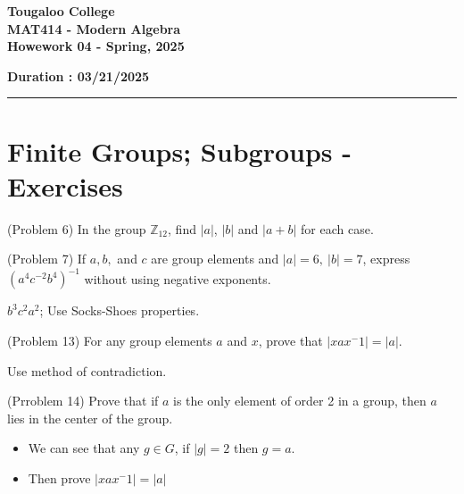 \documentclass[12pt]{exam}
\newcommand{\paper}[5]{
    \setcounter{page}{1}
    
    \begin{minipage}{\textwidth}
    \Large{\textbf{Tougaloo College}}\\
    \textbf{#2}\\
    \textbf{#5 - #3}\\
    \end{minipage}
    \hfill
        \begin{minipage}{6in}
            \textbf{\hspace{0.25in}Duration : #1}
        \end{minipage}
    
    \vspace{0.1in}
    \rule[1ex]{\textwidth}{2pt}
    }
\begin{document}
\paper{03/21/2025}{MAT414 - Modern Algebra}{Spring, 2025}{}{Howework 04}

\section*{Finite Groups; Subgroups - Exercises}
\begin{questions}

\question[] (Problem 6) In the group \(\mathbb{Z}_{12}\), find \(|a|\), \(|b|\) and \(|a+b|\) for each case.

\question[] (Problem 7) If \(a,b,\) and \(c\) are group elements and \(|a|=6,~|b|=7\), express \((a^4c^{-2}b^4)^{-1}\) without using negative exponents.

\begin{solution}
    \(b^3c^2a^2\); Use Socks-Shoes properties. 
\end{solution}

\question[] (Problem 13) For any group elements \(a\) and \(x\), prove that \(|xax^-1|=|a|\).

\begin{solution}
    Use method of contradiction.
\end{solution}

\question[] (Prroblem 14) Prove that if \(a\) is the only element of order 2 in a group, then \(a\) lies in the center of the group. 

\begin{solution}
    \begin{itemize}
        \item We can see that any \(g \in G\), if \(|g|=2\) then \(g=a\).
        \item Then prove \(|xax^-1|=|a|\)
    \end{itemize}
\end{solution}


\end{questions}
\end{document}
